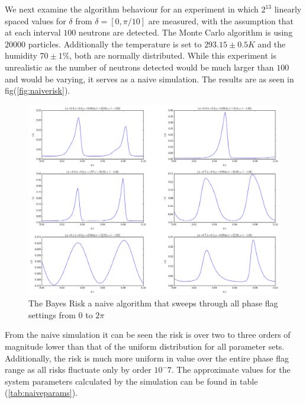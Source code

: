 We next examine the algorithm behaviour for an experiment in which $2^13$ linearly spaced values for $\delta$ from $\delta=[0,\pi/10]$ are measured, with the assumption that at each interval $100$ neutrons are detected. The Monte Carlo algorithm is using $20000$ particles. Additionally the temperature is set to $293.15\pm0.5K$ and the humidity $70\pm1\%$, both are normally distributed. While this experiment is unrealistic as the number of neutrons detected would be much larger than $100$ and would be varying, it serves as a naive simulation. The results are as seen in fig(\ref{fig:naiverisk}). 
\begin{figure}[ht!]
\centering
\includegraphics[scale=0.5]{Figures/naiverisk.png}
\caption{The Bayes Risk a naive algorithm that sweeps through all phase flag settings from $0$ to $2\pi$}
\label{fig:naiverisks}
\end{figure}
From the naive simulation it can be seen the risk is over two to three orders of magnitude lower than that of the uniform distribution for all parameter sets. Additionally, the risk is much more uniform in value over the entire phase flag range as all risks fluctuate only by order $10^-7$. The approximate values for the system parameters calculated by the simulation can be found in table (\ref{tab:naiveparams}). 

